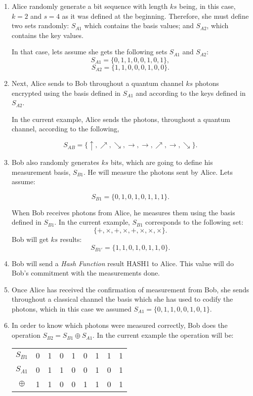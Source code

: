 \begin{enumerate}
  \item Alice randomly generate a bit sequence with length $ks$ being, in this case, $k=2$ and $s=4$ as it was defined at the beginning.
      Therefore, she must define two sets randomly: $S_{A1}$ which contains the basis values; and $S_{A2}$, which contains the key values.

      In that case, lets assume she gets the following sets $S_{A1}$ and $S_{A2}$:
      $$S_{A1} = \{0,1,1,0,0,1,0,1 \},$$
      $$S_{A2} = \{1,1,0,0,0,1,0,0 \}.$$

  \item Next, Alice sends to Bob throughout a quantum channel $ks$ photons encrypted using the basis defined in $S_{A1}$ and according to the keys defined in $S_{A2}$.

      In the current example, Alice sends the photons, throughout a quantum channel, according to the following,

      $$S_{AB} = \{\uparrow, \nearrow, \searrow, \to, \to, \nearrow, \to, \searrow \}.$$

  \item Bob also randomly generates $ks$ bits, which are going to define his measurement basis, $S_{B1}$. He will measure the photons sent by Alice. Lets assume:

  $$S_{B1} = \{0,1,0,1,0,1,1,1 \}.$$

    When Bob receives photons from Alice, he measures them using the basis defined in $S_{B1}$.
  In the current example, $S_{B1}$ corresponds to the following set:
  $$\{ +,\times,+,\times,+,\times, \times, \times \}.$$
  Bob will get $ks$ results:
  $$S_{B1\prime} = \{1,1,0,1,0,1,1,0 \}.$$

  \item Bob will send a \textit{Hash Function} result HASH1 to Alice. This value will do Bob's commitment with the measurements done.

  \item Once Alice has received the confirmation of measurement from Bob, she sends throughout a classical channel the basis which she has used to codify the photons, which in this case we assumed $S_{A1} = \{0,1,1,0,0,1,0,1\}$.

  \item In order to know which photons were measured correctly, Bob does the operation $S_{B2}=S_{B1} \oplus S_{A1}$.
      In the current example the operation will be:

  \begin{table}[H]
    \centering
    \begin{tabular}{c|c c c c c c c c}
     $S_{B1}$ & 0 & 1 & 0 & 1 & 0 & 1 & 1 & 1 \\
     $S_{A1}$ & 0 & 1 & 1 & 0 & 0 & 1 & 0 & 1 \\ \hline
     $\oplus$ & 1 & 1 & 0 & 0 & 1 & 1 & 0 & 1
    \end{tabular}
    \end{table}


\end{enumerate}
